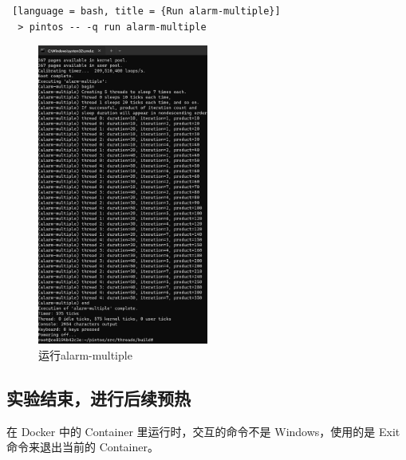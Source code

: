\begin{lstlisting} [language = bash, title = {Run alarm-multiple}]
  > pintos -- -q run alarm-multiple
\end{lstlisting}

\begin{figure} [H]
  \centering  
  \includegraphics[width=0.5\textwidth]{img1/Alarm.png}
  \caption{运行alarm-multiple}
  \label{fig:runalarm}
\end{figure}

\subsection{实验结束，进行后续预热}

在 Docker 中的 Container 里运行时，交互的命令不是 Windows，使用的是 Exit 命令来退出当前的 Container。

